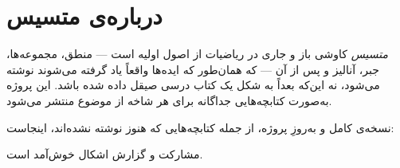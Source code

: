 \chapter*{درباره‌ی متسیس}

\textit{متسیس} کاوشی باز و جاری در ریاضیات از اصول اولیه است ---
منطق، مجموعه‌ها، جبر، آنالیز و پس از آن --- که همان‌طور که ایده‌ها
واقعاً یاد گرفته می‌شوند نوشته می‌شود، نه این‌که بعداً به شکل یک
کتاب درسی صیقل داده شده باشد. این پروژه به‌صورت کتابچه‌هایی جداگانه
برای هر شاخه از موضوع منتشر می‌شود.

نسخه‌ی کامل و به‌روزِ پروژه، از جمله کتابچه‌هایی که هنوز نوشته
نشده‌اند، اینجاست:

\begin{center}
\end{center}

مشارکت و گزارش اشکال خوش‌آمد است.
